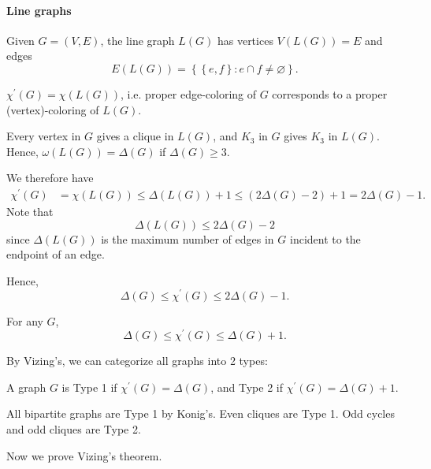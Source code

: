\paragraph{Line graphs}
Given \(G=(V, E)\), the line graph \(L(G)\) has vertices \(V(L(G)) = E\) and edges 
\[
    E(L(G)) = \left\{ \left\{ e, f \right\}: e \cap f \neq \varnothing  \right\}. 
\]   

\begin{observation}
    \(\chi^{\prime} (G) = \chi (L(G))\), i.e. proper edge-coloring of \(G\) corresponds to a proper (vertex)-coloring of \(L(G)\).     
\end{observation}

\begin{observation}
    Every vertex in \(G\) gives a clique in \(L(G)\), and \(K_3\) in \(G\) gives \(K_3\) in \(L(G)\). Hence, \(\omega (L(G)) = \Delta (G)\) if \(\Delta (G) \ge 3\).          
\end{observation}

We therefore have 
\begin{align*}
    \chi ^{\prime} (G) &= \chi (L(G)) \le \Delta (L(G)) + 1 \le (2 \Delta (G) - 2) + 1 = 2 \Delta (G) - 1.
\end{align*}
Note that 
\[
    \Delta (L(G)) \le 2 \Delta (G) - 2
\]
since \(\Delta (L(G))\) is the maximum number of edges in \(G\) incident to the endpoint of an edge. 

Hence,
\[
    \Delta (G) \le \chi ^{\prime} (G) \le 2 \Delta (G) - 1.
\]

\begin{theorem}[Vizing]
    For any \(G\), 
    \[
      \Delta (G) \le \chi ^{\prime} (G) \le \Delta (G) + 1.  
    \] 
\end{theorem}

By Vizing's, we can categorize all graphs into 2 types:

\begin{definition}
    A graph \(G\) is Type 1 if \(\chi ^{\prime} (G) = \Delta (G)\), and Type 2 if \(\chi ^{\prime} (G) = \Delta (G) + 1\).   
\end{definition}

\begin{eg}
    All bipartite graphs are Type 1 by Konig's. Even cliques are Type 1. Odd cycles and odd cliques are Type 2.
\end{eg}

Now we prove Vizing's theorem.

